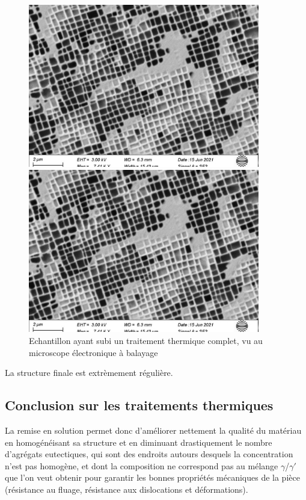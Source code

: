 \begin{figure}[htbp]
    \centering
    \begin{minipage}{0.45\textwidth}
        \includegraphics[width=0.9\textwidth]{images_meb/TTH1914.pdf}
    \end{minipage}%
    \begin{minipage}{0.45\textwidth}
        \includegraphics[width=0.9\textwidth]{images_meb/TTH1914.pdf}
    \end{minipage}%
    \caption{Echantillon ayant subi un traitement thermique complet, 
    vu au microscope électronique à balayage}
    \label{fig:complet_MEB}
\end{figure}

La structure finale est extrèmement régulière.\\

\subsection*{Conclusion sur les traitements thermiques}

La remise en solution permet donc d'améliorer nettement la qualité du matériau en
homogénéisant sa structure et en diminuant drastiquement le nombre d'agrégats
eutectiques, qui sont des endroits autours desquels la concentration n'est pas 
homogène, et dont la composition ne correspond pas au mélange $\gamma$/$\gamma'$
que l'on veut obtenir pour garantir les bonnes propriétés mécaniques de la pièce 
(résistance au fluage, résistance aux dislocations et déformations).



